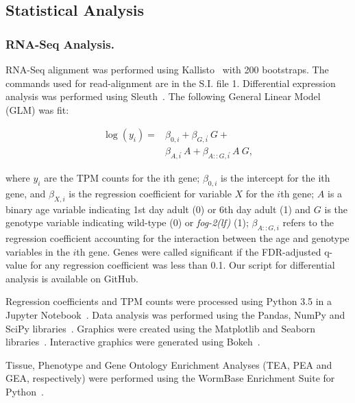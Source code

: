 \documentclass[10pt,letterpaper,twocolumn]{article}
\newcommand{\fog}{\emph{\mbox{fog-2(lf)}}}
\begin{document}
\subsection*{Statistical Analysis}
\label{sb:statistics}
\subsubsection*{RNA-Seq Analysis.}
\label{sb:model}
RNA-Seq alignment was performed using Kallisto~\cite{Bray2016} with 200
bootstraps. The commands used for read-alignment are in the S.I. file 1.
Differential expression analysis was performed using Sleuth~\cite{Pimentel2016}.
The following General Linear Model (GLM) was fit:

\begin{align*}
  \log(y_i) =& \beta_{0,i} + \beta_{G,i}\dot~G + \\
  &\beta_{A,i}\dot~A + \beta_{A::G,i}\dot~A~G,
  \label{eqn:GLM}
\end{align*}

where $y_i$ are the TPM counts for the ith gene; $\beta_{0,i}$ is the intercept
for the ith gene, and $\beta_{X,i}$ is the regression coefficient for variable
$X$ for the $i$th gene; $A$ is a binary age variable indicating 1st day adult
(0) or 6th day adult (1) and $G$ is the genotype variable indicating wild-type
(0) or \fog{} (1); $\beta_{A::G, i}$ refers to the regression coefficient
accounting for the interaction between the age and genotype variables in the
$i$th gene. Genes were called significant if the FDR-adjusted q-value for any
regression coefficient was less than 0.1. Our script for differential analysis
is available on GitHub.

Regression coefficients and TPM counts were processed using Python 3.5 in a
Jupyter Notebook~\cite{Perez2007}. Data analysis was performed using the Pandas,
NumPy and SciPy libraries~\cite{McKinney2011,VanDerWalt2011,Oliphant2007}.
Graphics were created using the Matplotlib and Seaborn
libraries~\cite{Waskom,Hunter2007}. Interactive graphics were generated using
Bokeh~\cite{Team2014}.

Tissue, Phenotype and Gene Ontology Enrichment
Analyses (TEA, PEA and GEA, respectively) were performed using the WormBase
Enrichment Suite for Python~\cite{Angeles-Albores2016,Angeles-Albores106369}.
\end{document}

